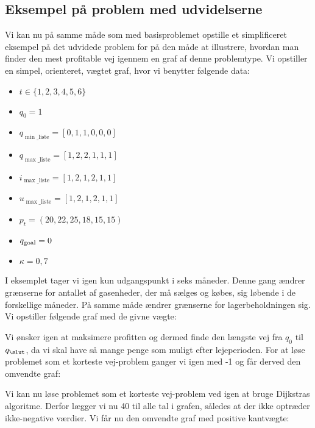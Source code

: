 \subsection{Eksempel på problem med udvidelserne} \label{kap:grafen_for_udvidet}
Vi kan nu på samme måde som med basisproblemet opstille et simplificeret eksempel på det udvidede problem for på den måde at illustrere, hvordan man finder den mest profitable vej igennem en graf af denne problemtype. Vi opstiller en simpel, orienteret, vægtet graf, hvor vi benytter følgende data:

\begin{itemize}
  \item $t \in \{1,2,3,4,5,6\}$
  \item $q_{0}=1$
  \item $q_{\min \_ \textrm{liste}}=[0,1,1,0,0,0]$
  \item $q_{\max \_ \textrm{liste}}=[1,2,2,1,1,1]$
  \item $i_{\max \_ \textrm{liste}}=[1,2,1,2,1,1]$
  \item $u_{\max \_ \textrm{liste}}=[1,2,1,2,1,1]$
  \item $p_{t}=(20,22,25,18,15,15)$
  \item $q_{\textrm{goal}}=0$
  \item $\kappa=0,7$
\end{itemize}

I eksemplet tager vi igen kun udgangspunkt i seks måneder. Denne gang ændrer grænserne for antallet af gasenheder, der må sælges og købes, sig løbende i de forskellige måneder. På samme måde ændrer grænserne for lagerbeholdningen sig. Vi opstiller følgende graf med de givne vægte:



Vi ønsker igen at maksimere profitten og dermed finde den længste vej fra $q_{0}$ til $q_{\slut}$, da vi skal have så mange penge som muligt efter lejeperioden. For at løse problemet som et korteste vej-problem ganger vi igen med -1 og får derved den omvendte graf:



Vi kan nu løse problemet som et korteste vej-problem ved igen at bruge Dijkstras algoritme. Derfor lægger vi nu 40 til alle tal i grafen, således at der ikke optræder ikke-negative værdier. Vi får nu den omvendte graf med positive kantvægte:




